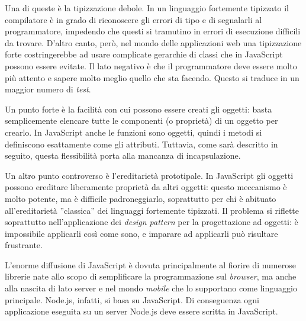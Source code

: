Una di queste è la tipizzazione debole. In un linguaggio fortemente tipizzato il compilatore è in grado di riconoscere gli errori di tipo e di segnalarli al programmatore, impedendo che questi si tramutino in errori di esecuzione difficili da trovare. D'altro canto, però, nel mondo delle applicazioni web una tipizzazione forte costringerebbe ad usare complicate gerarchie di classi che in JavaScript possono essere evitate. Il lato negativo è che il programmatore deve essere molto più attento e sapere molto meglio quello che sta facendo. Questo si traduce in un maggior numero di \textit{test}. 

Un punto forte è la facilità con cui possono essere creati gli oggetti: basta semplicemente elencare tutte le componenti (o proprietà) di un oggetto per crearlo. In JavaScript anche le funzioni sono oggetti, quindi i metodi si definiscono esattamente come gli attributi. Tuttavia, come sarà descritto in seguito, questa flessibilità porta alla mancanza di incapsulazione.

Un altro punto controverso è l'ereditarietà prototipale. In JavaScript gli oggetti possono ereditare liberamente proprietà da altri oggetti: questo meccanismo è molto potente, ma è difficile padroneggiarlo, soprattutto per chi è abituato all'ereditarietà ''classica'' dei linguaggi fortemente tipizzati. Il problema si riflette soprattutto nell'applicazione dei \textit{design pattern} per la progettazione ad oggetti: è impossibile applicarli così come sono, e imparare ad applicarli può risultare frustrante. 

L'enorme diffusione di JavaScript è dovuta principalmente al fiorire di numerose librerie nate allo scopo di semplificare la programmazione sul \textit{browser}, ma anche alla nascita di  lato server e nel mondo \textit{mobile} che lo supportano come linguaggio principale. Node.js, infatti, si basa su JavaScript. Di conseguenza ogni applicazione eseguita su un server Node.js deve essere scritta in JavaScript. 
